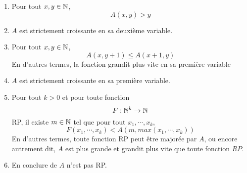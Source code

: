 \begin{proposition}
	\begin{enumerate}
		\item Pour tout $x, y \in \mathbb{N}$,
			\begin{equation}
				A(x, y) > y
			\end{equation}
		\item $A$ est strictement croissante en sa deuxième variable.
		\item Pour tout $x, y \in \mathbb{N}$,
			\begin{equation}
				A(x, y + 1) \leq A(x + 1, y)
			\end{equation}
			En d'autres termes, la fonction grandit plus vite en sa première variable
		\item $A$ est strictement croissante en sa première variable.
		\item Pour tout $k > 0$ et pour toute fonction
			\begin{equation}
				F : \mathbb{N}^{k} \rightarrow \mathbb{N}
			\end{equation}
			RP, il existe $m \in \mathbb{N}$
			tel que pour tout $x_{1}, \cdots, x_{k}$,
			\begin{equation}
				F(x_{1}, \cdots, x_{k}) < A(m, max(x_{1}, \cdots, x_{k}))
			\end{equation}
			En d'autres termes, toute fonction RP peut être majorée par $A$, ou
			encore autrement dit, $A$ est plus grande et grandit plus vite que
			toute fonction $RP$.
		\item En conclure de $A$ n'est pas RP.
	\end{enumerate}
\end{proposition}

